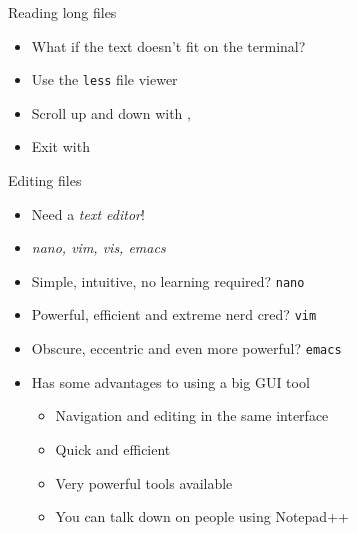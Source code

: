     \begin{frame}[t,fragile]{Reading long files}
        \begin{itemize}
            \item What if the text doesn't fit on the terminal?
            \item Use the \texttt{less} file viewer
            \item Scroll up and down with \keys{\arrowkeyup}, \keys{\arrowkeydown}
            \item Exit with 
        \end{itemize}
    \end{frame}

    \begin{frame}[t,fragile]{Editing files}
        \begin{itemize}
            \item Need a \emph{text editor}!
            \item \emph{nano, vim, vis, emacs}
            \item Simple, intuitive, no learning required? \textrightarrow\:\texttt{nano}
            \item Powerful, efficient and extreme nerd cred? \textrightarrow\:\texttt{vim}
            \item Obscure, eccentric and even more powerful? \textrightarrow\:\texttt{emacs}
            \item Has some advantages to using a big GUI tool
                \begin{itemize}
                    \item Navigation and editing in the same interface
                    \item Quick and efficient
                    \item Very powerful tools available
                    \item You can talk down on people using Notepad++
                \end{itemize}
        \end{itemize}
    \end{frame}

